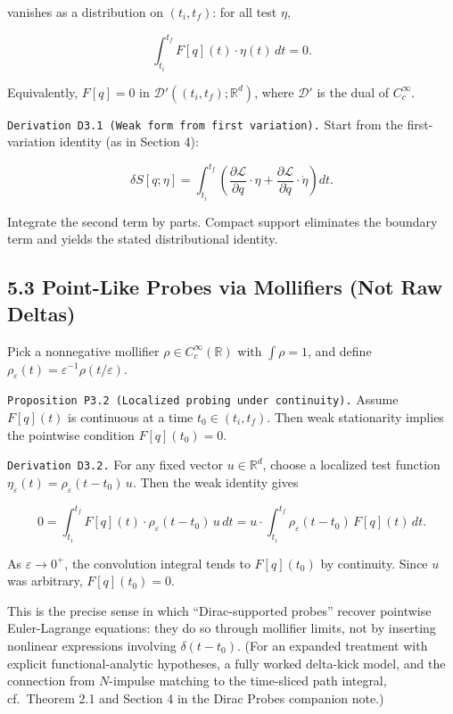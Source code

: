 \documentclass[
]{article}
\begin{document}
vanishes as a distribution on \((t_i,t_f)\): for all test \(\eta\),

\[
\int_{t_i}^{t_f} F[q](t)\cdot\eta(t)\,dt=0.
\]

Equivalently, \(F[q]=0\) in \(\mathcal D'((t_i,t_f);\mathbb R^d)\),
where \(\mathcal D'\) is the dual of \(C_c^\infty\).

\texttt{Derivation\ D3.1\ (Weak\ form\ from\ first\ variation).} Start
from the first-variation identity (as in Section 4):

\[
\delta S[q;\eta]
=\int_{t_i}^{t_f}\left(
\frac{\partial\mathcal L}{\partial q}\cdot\eta
+
\frac{\partial\mathcal L}{\partial\dot q}\cdot\dot\eta
\right)dt.
\]

Integrate the second term by parts. Compact support eliminates the
boundary term and yields the stated distributional identity.

\subsection{5.3 Point-Like Probes via Mollifiers (Not Raw
Deltas)}\label{point-like-probes-via-mollifiers-not-raw-deltas}

Pick a nonnegative mollifier \(\rho\in C_c^\infty(\mathbb R)\) with
\(\int\rho=1\), and define
\(\rho_\varepsilon(t)=\varepsilon^{-1}\rho(t/\varepsilon)\).

\texttt{Proposition\ P3.2\ (Localized\ probing\ under\ continuity).}
Assume \(F[q](t)\) is continuous at a time \(t_0\in(t_i,t_f)\). Then
weak stationarity implies the pointwise condition \(F[q](t_0)=0\).

\texttt{Derivation\ D3.2.} For any fixed vector \(u\in\mathbb R^d\),
choose a localized test function
\(\eta_\varepsilon(t)=\rho_\varepsilon(t-t_0)\,u\). Then the weak
identity gives

\[
0=\int_{t_i}^{t_f} F[q](t)\cdot \rho_\varepsilon(t-t_0)\,u\,dt
=u\cdot\int_{t_i}^{t_f} \rho_\varepsilon(t-t_0)\,F[q](t)\,dt.
\]

As \(\varepsilon\to 0^+\), the convolution integral tends to
\(F[q](t_0)\) by continuity. Since \(u\) was arbitrary, \(F[q](t_0)=0\).

This is the precise sense in which ``Dirac-supported probes'' recover
pointwise Euler-Lagrange equations: they do so through mollifier limits,
not by inserting nonlinear expressions involving \(\delta(t-t_0)\). (For
an expanded treatment with explicit functional-analytic hypotheses, a
fully worked delta-kick model, and the connection from \(N\)-impulse
matching to the time-sliced path integral, cf.~Theorem 2.1 and Section 4
in the Dirac Probes companion note.)
\end{document}
